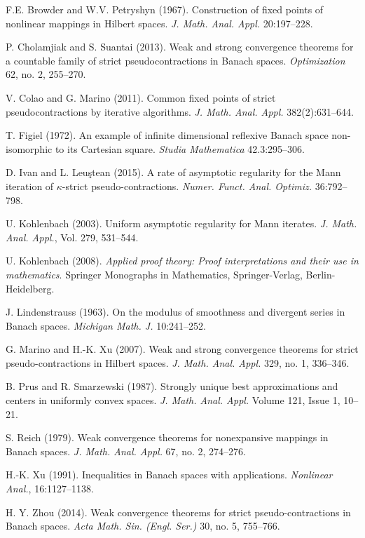\documentclass{article}
\begin{document}
\begin{thebibliography}{}

F.E. Browder and W.V. Petryshyn (1967).
Construction of fixed points of nonlinear mappings in Hilbert spaces.
{\it J. Math. Anal. Appl.} 20:197--228.

P. Cholamjiak and S. Suantai (2013).
Weak and strong convergence theorems for a countable family of strict pseudocontractions in Banach spaces.
\emph{Optimization} 62, no. 2, 255--270.

V. Colao and G. Marino (2011).
Common fixed points of strict pseudocontractions by iterative algorithms.
{\it J. Math. Anal. Appl.} 382(2):631--644.
   
T. Figiel (1972).
An example of infinite dimensional reflexive Banach space non-isomorphic to its Cartesian square.
\emph{Studia Mathematica} 42.3:295--306.

D. Ivan and L. Leu\c{s}tean (2015).
A rate of asymptotic regularity for the Mann iteration of $\kappa$-strict pseudo-contractions.
{\it Numer. Funct. Anal. Optimiz.} 36:792--798.

U. Kohlenbach (2003).
Uniform asymptotic regularity for Mann iterates.
\emph{J. Math. Anal. Appl.}, Vol. 279, 531--544.

U. Kohlenbach (2008).
{\it Applied proof theory: Proof interpretations and their use in mathematics}.
Springer Monographs in Mathematics,
Springer-Verlag,
Berlin-Heidelberg.

J. Lindenstrauss (1963).
On the modulus of smoothness and divergent series in Banach spaces.
\emph{Michigan Math. J.} 10:241--252.
   
G. Marino and H.-K. Xu (2007).
Weak and strong convergence theorems for strict pseudo-contractions in Hilbert spaces.
\emph{J. Math. Anal. Appl.} 329, no. 1, 336--346.

B. Prus and R. Smarzewski (1987).
Strongly unique best approximations and centers in uniformly convex spaces.
\emph{J. Math. Anal. Appl.} Volume 121, Issue 1, 10--21.

S. Reich (1979).
Weak convergence theorems for nonexpansive mappings in Banach spaces.
\emph{J. Math. Anal. Appl.} 67, no. 2, 274--276.
   
H.-K. Xu (1991).
Inequalities in Banach spaces with applications. 
\emph{Nonlinear Anal.}, 16:1127--1138.

H. Y. Zhou (2014).
Weak convergence theorems for strict pseudo-contractions in Banach spaces.
\emph{Acta Math. Sin. (Engl. Ser.)} 30, no. 5, 755--766.

\end{thebibliography}
\end{document}
